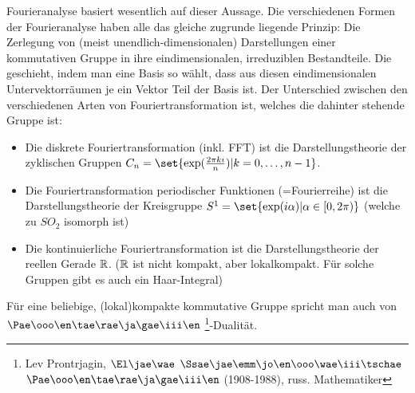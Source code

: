 \begin{remark}
Fourieranalyse basiert wesentlich auf dieser Aussage. Die verschiedenen Formen der Fourieranalyse haben alle das gleiche zugrunde liegende Prinzip: Die Zerlegung von (meist unendlich-dimensionalen) Darstellungen einer kommutativen Gruppe in ihre eindimensionalen, irreduziblen Bestandteile. Die geschieht, indem man eine Basis so wählt, dass aus diesen eindimensionalen Untervektorräumen je ein Vektor Teil der Basis ist. Der Unterschied zwischen den verschiedenen Arten von Fouriertransformation ist, welches die dahinter stehende Gruppe ist:

\begin{itemize}
\item Die diskrete Fouriertransformation (inkl. FFT) ist die Darstellungstheorie der zyklischen Gruppen $C_n = \set{\exp(\frac{2\pi k i}{n}) | k=0,\ldots,n-1}$.
\item Die Fouriertransformation periodischer Funktionen (=Fourierreihe) ist die Darstellungstheorie der Kreisgruppe $S^1 = \set{\exp(i\alpha) | \alpha\in[0,2\pi)}$ (welche zu $SO_2$ isomorph ist)
\item Die kontinuierliche Fouriertransformation ist die Darstellungstheorie der reellen Gerade $\mathbb{R}$. ($\mathbb{R}$ ist nicht kompakt, aber lokalkompakt. Für solche Gruppen gibt es auch ein Haar-Integral)
\end{itemize}

Für eine beliebige, (lokal)kompakte kommutative Gruppe spricht man auch von
$\Pae\ooo\en\tae\rae\ja\gae\iii\en$
\footnote{Lev Prontrjagin, $\El\jae\wae$ $\Ssae\jae\emm\jo\en\ooo\wae\iii\tschae$ $\Pae\ooo\en\tae\rae\ja\gae\iii\en$ (1908-1988), russ. Mathematiker}-Dualität.
\end{remark}

